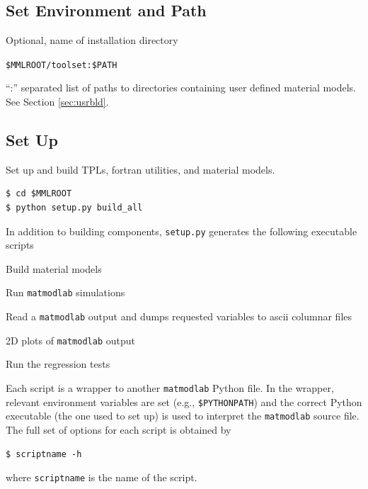 \documentclass[12pt,report,strict]{SANDreport/SANDreport}
\newcommand{\mml}{\texttt{matmodlab}}
\begin{document}
\subsection{Set Environment and Path}
\label{sec:setup}

\begin{description}[leftmargin=!,labelwidth=\widthof{\texttt{MMLMTLS}}]
  \item[\texttt{MMLROOT}] Optional, name of installation directory
  \item[\texttt{PATH}] \verb|$MMLROOT/toolset:$PATH|
  \item[\texttt{MMLMTLS}] ``:'' separated list of paths to directories
  containing user defined material models. See Section \ref{sec:usrbld}.
\end{description}

\subsection{Set Up}
\label{sec:setup-1}
Set up and build TPLs, fortran utilities, and material models.
%
\begin{verbatim}
$ cd $MMLROOT
$ python setup.py build_all
\end{verbatim}
%
In addition to building components, \texttt{setup.py} generates the following
executable scripts
%
\begin{description}[leftmargin=!,labelwidth=\widthof{\texttt{buildmtls}}]
  \item[\texttt{buildmtls}] Build material models
  \item[\texttt{mml}] Run \mml{} simulations
  \item[\texttt{exdump}] Read a \mml{} output and dumps requested variables
  to ascii columnar files
  \item[\texttt{mmv}] 2D plots of \mml{} output
  \item[\texttt{runtests}] Run the regression tests
\end{description}
%
Each script is a wrapper to another \mml{} Python file. In the wrapper,
relevant environment variables are set (e.g., \verb|$PYTHONPATH|) and the
correct Python executable (the one used to set up) is used to interpret the
\mml{} source file.  The full set of options for each script is obtained by
%
\begin{verbatim}
$ scriptname -h
\end{verbatim}
%
where \texttt{scriptname} is the name of the script.
\end{document}
